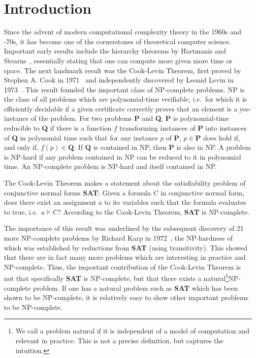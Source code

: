 \chapter{Introduction}\label{chap:introduction} 
\newcommand{\SAT}{\textbf{SAT}}
\newcommand{\Clique}{\textbf{Clique}}
\newcommand{\NP}{\textsf{NP}}
\newcommand{\PC}{\textsf{P}}

\newcommand{\PR}{\textbf{PR}}

Since the advent of modern computational complexity theory in the 1960s and -70s, it has become one of the cornerstones of theoretical computer science. 
Important early results include the hierarchy theorems by Hartmanis and Stearns~\cite{hartmanis_stearns}, essentially stating that one can compute more given more time or space. 
The next landmark result was the Cook-Levin Theorem, first proved by Stephen A. Cook in 1971~\cite{cook_theorem} and independently discovered by Leonid Levin in 1973~\cite{levin_theorem}. 
This result founded the important class of \NP{}-complete problems. \NP{} is the class of all problems which are polynomial-time verifiable, i.e.\ for which it is efficiently decidable if a given certificate correctly proves that an element is a yes-instance of the problem. For two problems \textbf{P} and \textbf{Q}, \textbf{P} is polynomial-time reducible to \textbf{Q} if there is a function $f$ transforming instances of \textbf{P} into instances of \textbf{Q} in polynomial time such that for any instance $p$ of \textbf{P}, $p \in \textbf{P}$ does hold if, and only if, $f(p) \in \textbf{Q}$. 
If $\textbf{Q}$ is contained in \NP{}, then $\textbf{P}$ is also in \NP{}.
A problem is \NP{}-hard if any problem contained in \NP{} can be reduced to it in polynomial time. An \NP{}-complete problem is \NP{}-hard and itself contained in \NP{}.  

The Cook-Levin Theorem makes a statement about the satisfiability problem of conjunctive normal forms \SAT{}: 
Given a formula $C$ in conjunctive normal form, does there exist an assignment $a$ to its variables such that the formula evaluates to \textsf{true}, i.e.\ $a \models C$?
According to the Cook-Levin Theorem, \SAT{} is \NP{}-complete. 

The importance of this result was underlined by the subsequent discovery of 21 more \NP{}-complete problems by Richard Karp in 1972~\cite{Karp1972}, the \NP{}-hardness of which was established by reductions from \textbf{SAT} (using transitivity). This showed that there are in fact many more problems which are interesting in practice and \NP{}-complete. 
Thus, the important contribution of the Cook-Levin Theorem is not that specifically \SAT{} is \NP{}-complete, but that there exists a natural\footnote{We call a problem natural if it is independent of a model of computation and relevant in practice. This is not a precise definition, but captures the intuition.}\NP{}-complete problem. If one has a natural problem such as \SAT{} which has been shown to be \NP{}-complete, it is relatively easy to show other important problems to be \NP{}-complete.

